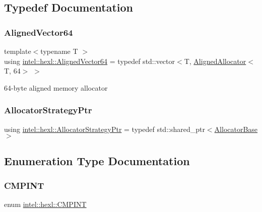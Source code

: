 \subsection{Typedef Documentation}
\mbox{\label{namespaceintel_1_1hexl_afbdf0d2cc4209ee547a88ff22a02801b}} 
\subsubsection{\texorpdfstring{Aligned\+Vector64}{AlignedVector64}}
{\footnotesize\ttfamily template$<$typename T $>$ \\
using \hyperlink{namespaceintel_1_1hexl_afbdf0d2cc4209ee547a88ff22a02801b}{intel\+::hexl\+::\+Aligned\+Vector64} = typedef std\+::vector$<$T, \hyperlink{classintel_1_1hexl_1_1AlignedAllocator}{Aligned\+Allocator}$<$T, 64$>$ $>$}



64-\/byte aligned memory allocator 

\mbox{\label{namespaceintel_1_1hexl_aced64250965d3b78827d8009634eef0c}} 
\subsubsection{\texorpdfstring{Allocator\+Strategy\+Ptr}{AllocatorStrategyPtr}}
{\footnotesize\ttfamily using \hyperlink{namespaceintel_1_1hexl_aced64250965d3b78827d8009634eef0c}{intel\+::hexl\+::\+Allocator\+Strategy\+Ptr} = typedef std\+::shared\+\_\+ptr$<$\hyperlink{structintel_1_1hexl_1_1AllocatorBase}{Allocator\+Base}$>$}



\subsection{Enumeration Type Documentation}
\mbox{\label{namespaceintel_1_1hexl_abdcc9d2d5bb10fa95d5f143874508006}} 
\subsubsection{\texorpdfstring{C\+M\+P\+I\+NT}{CMPINT}}
{\footnotesize\ttfamily enum \hyperlink{namespaceintel_1_1hexl_abdcc9d2d5bb10fa95d5f143874508006}{intel\+::hexl\+::\+C\+M\+P\+I\+NT}\hspace{0.3cm}{\ttfamily [strong]}}



